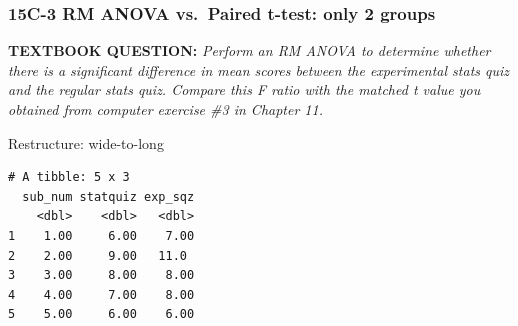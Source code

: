 \documentclass[]{article}
\newenvironment{Shaded}{\begin{snugshade}}{\end{snugshade}}
\newcommand{\KeywordTok}[1]{\textcolor[rgb]{0.13,0.29,0.53}{\textbf{#1}}}
\newcommand{\DataTypeTok}[1]{\textcolor[rgb]{0.13,0.29,0.53}{#1}}
\newcommand{\DecValTok}[1]{\textcolor[rgb]{0.00,0.00,0.81}{#1}}
\newcommand{\StringTok}[1]{\textcolor[rgb]{0.31,0.60,0.02}{#1}}
\newcommand{\OperatorTok}[1]{\textcolor[rgb]{0.81,0.36,0.00}{\textbf{#1}}}
\newcommand{\NormalTok}[1]{#1}
\begin{document}
\subsubsection{15C-3 RM ANOVA vs.~Paired t-test: only 2
groups}\label{c-3-rm-anova-vs.paired-t-test-only-2-groups}

\textbf{TEXTBOOK QUESTION:} \emph{Perform an RM ANOVA to determine
whether there is a significant difference in mean scores between the
experimental stats quiz and the regular stats quiz. Compare this F ratio
with the matched t value you obtained from computer exercise \#3 in
Chapter 11.}

Restructure: wide-to-long

\begin{Shaded}
\end{Shaded}

\begin{verbatim}
# A tibble: 5 x 3
  sub_num statquiz exp_sqz
    <dbl>    <dbl>   <dbl>
1    1.00     6.00    7.00
2    2.00     9.00   11.0 
3    3.00     8.00    8.00
4    4.00     7.00    8.00
5    5.00     6.00    6.00
\end{verbatim}

\begin{Shaded}
\end{Shaded}
\end{document}
